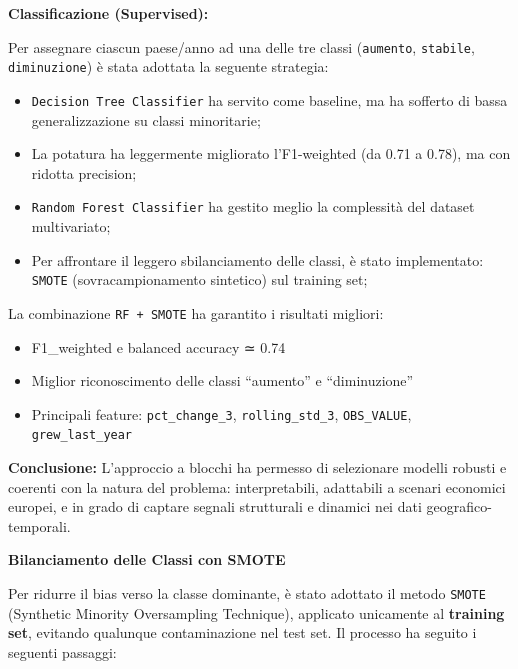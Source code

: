 \documentclass[conference]{IEEEtran}
\begin{document}
\vspace{0.5em} \noindent\textbf{Classificazione (Supervised):} 

Per assegnare ciascun paese/anno ad una delle tre classi (\texttt{aumento}, \texttt{stabile}, \texttt{diminuzione}) è stata adottata la seguente strategia:

\begin{itemize} \item \texttt{Decision Tree Classifier} ha servito come baseline, ma ha sofferto di bassa generalizzazione su classi minoritarie; \item La potatura ha leggermente migliorato l’F1-weighted (da 0.71 a 0.78), ma con ridotta precision; \item \texttt{Random Forest Classifier} ha gestito meglio la complessità del dataset multivariato; \item Per affrontare il leggero sbilanciamento delle classi, è stato implementato: \texttt{SMOTE} (sovracampionamento sintetico) sul training set; 
\end{itemize}

La combinazione \texttt{RF + SMOTE} ha garantito i risultati migliori:

{\raggedright
\begin{itemize} 
    \item F1\_weighted e balanced accuracy ≃ 0.74 
    \item Miglior riconoscimento delle classi “aumento” e “diminuzione” 
    \item Principali feature: \texttt{pct\_change\_3}, \texttt{rolling\_std\_3}, \texttt{OBS\_VALUE}, \texttt{grew\_last\_year} 
\end{itemize}
}

\vspace{0.5em} \noindent\textbf{Conclusione:} L’approccio a blocchi ha permesso di selezionare modelli robusti e coerenti con la natura del problema: interpretabili, adattabili a scenari economici europei, e in grado di captare segnali strutturali e dinamici nei dati geografico-temporali.

\vspace{1em}\noindent\textbf{Bilanciamento delle Classi con SMOTE}

Per ridurre il bias verso la classe dominante, è stato adottato il metodo \texttt{SMOTE} (Synthetic Minority Oversampling Technique), applicato unicamente al \textbf{training set}, evitando qualunque contaminazione nel test set. Il processo ha seguito i seguenti passaggi:
\end{document}
